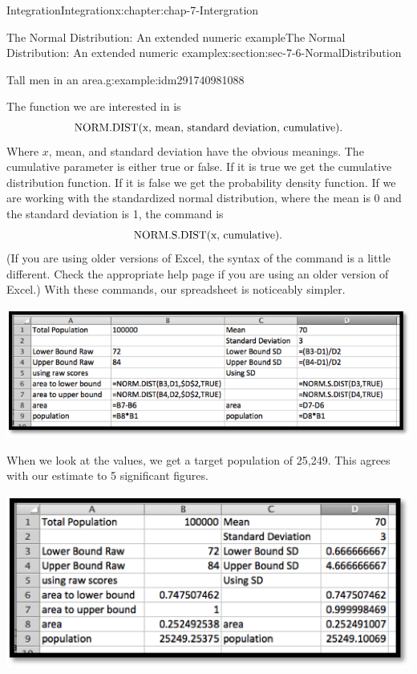 \documentclass[oneside,10pt,]{book}
\numberwithin{equation}{section}
\begin{document}
\begin{chapterptx}{Integration}{}{Integration}{}{}{x:chapter:chap-7-Intergration}
\begin{sectionptx}{The Normal Distribution: An extended numeric example}{}{The Normal Distribution: An extended numeric example}{}{}{x:section:sec-7-6-NormalDistribution}
\begin{example}{Tall men in an area.}{g:example:idm291740981088}
\par
The function we are interested in is%
%
\begin{equation*}
\hbox{NORM.DIST(x, mean, standard deviation, cumulative).}
\end{equation*}
Where \(x\), mean, and standard deviation have the obvious meanings.  The cumulative parameter is either true or false.  If it is true we get the cumulative distribution function.  If it is false we get the probability density function.  If we are working with the standardized normal distribution, where the mean is 0 and the standard deviation is 1, the command is%
%
\begin{equation*}
\hbox{NORM.S.DIST(x, cumulative).}
\end{equation*}
(If you are using older versions of Excel, the syntax of the command is a little different.  Check the appropriate help page if you are using an older version of Excel.)  With these commands, our spreadsheet is noticeably simpler.%
\begin{sidebyside}{1}{0.15}{0.15}{0}%
\begin{sbspanel}{0.7}%
\includegraphics[width=\linewidth]{images/sec7-6-4.png}
\end{sbspanel}%
\end{sidebyside}%
\par
When we look at the values, we get a target population of 25,249.  This agrees with our estimate to 5 significant figures.%
\begin{sidebyside}{1}{0.25}{0.25}{0}%
\begin{sbspanel}{0.5}%
\includegraphics[width=\linewidth]{images/sec7-6-5.png}

\end{sbspanel}
\end{sidebyside}
\end{example}
\end{sectionptx}
\end{chapterptx}
\end{document}
